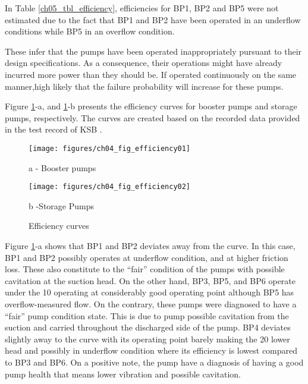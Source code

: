 In Table \ref{ch05_tbl_efficiency}, efficiencies for BP1, BP2 and BP5 were not estimated due to the fact that BP1 and BP2 have been operated in an underflow 
conditions while BP5 in an overflow condition.

These infer that the pumps have been operated inappropriately pursuant to their design specifications. As a consequence, their operations might have already incurred more power 
than they should be. 
If operated continuously on the same manner,high likely that the failure probability will increase for these pumps.

Figure \ref{ch04_efficiencycurves}-a, and \ref{ch04_efficiencycurves}-b presents the efficiency curves for booster pumps and storage pumps, respectively. 
The curves are created based on the recorded data provided in the test record of KSB \cite{KSB2010}. 

\begin{figure}[!htb]

	\begin{minipage}[b]{0.5\linewidth}

		\centering

		\texttt{[image: figures/ch04\_fig\_efficiency01]}

		\caption*{a - Booster pumps}%

	\end{minipage}

	\hspace{0.05cm}

	\begin{minipage}[b]{0.5\linewidth}

		\centering

		\texttt{[image: figures/ch04\_fig\_efficiency02]}

		\caption*{b -Storage Pumps} %

	\end{minipage}

		\caption{Efficiency curves}

		\label{ch04_efficiencycurves}

\end{figure}



Figure \ref{ch04_efficiencycurves}-a shows that BP1 and BP2 deviates away from the curve. In this case, BP1 and BP2 possibly operates at underflow condition, 
and at higher friction loss. These also constitute to the “fair” condition of the pumps with possible cavitation at the suction head. On the other hand, BP3, BP5, and BP6 operate under the 10%
operating at considerably good operating point although BP5 has overflow-measured flow. On the contrary, these pumps were diagnosed to have a “fair” pump condition state. 
This is due to pump possible cavitation from the suction and carried throughout the discharged side of the pump.
BP4 deviates slightly away to the curve with its operating point barely making the 20%
lower head and possibly in underflow condition where its efficiency is lowest compared to BP3 and BP6. On a positive note, the pump have a diagnosis of having a good
pump health that means lower vibration and possible cavitation.

